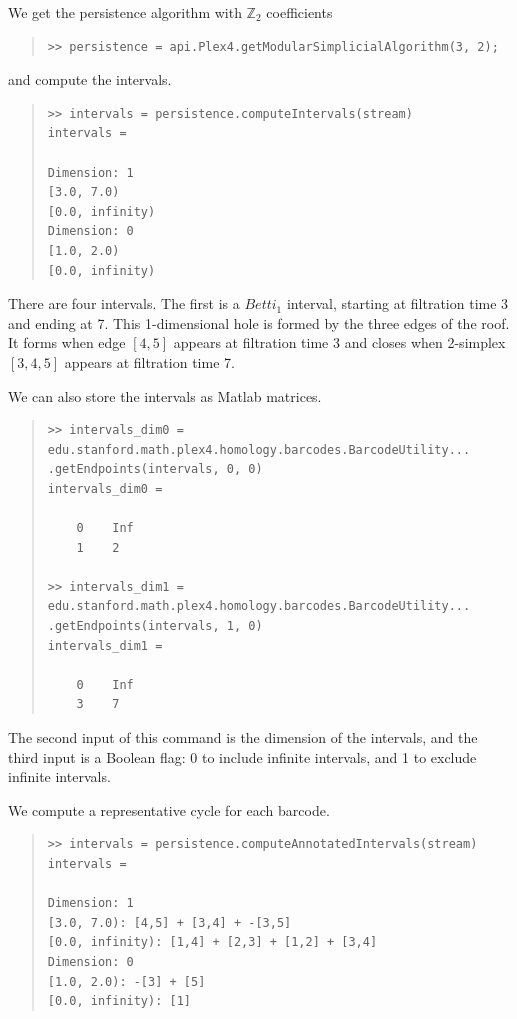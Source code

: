 \documentclass[amscd, amssymb, verbatim]{amsart}[12pt]
\theoremstyle{remark}
\theoremstyle{remark}
\theoremstyle{remark}
\begin{document}
We get the persistence algorithm with $\mathbb{Z}_2$ coefficients
\begin{quote} \begin{verbatim}
>> persistence = api.Plex4.getModularSimplicialAlgorithm(3, 2);
\end{verbatim} \end{quote}

and compute the intervals.

\begin{quote} \begin{verbatim}
>> intervals = persistence.computeIntervals(stream)
intervals =

Dimension: 1
[3.0, 7.0)
[0.0, infinity)
Dimension: 0
[1.0, 2.0)
[0.0, infinity)
\end{verbatim} \end{quote}

There are four intervals. The first is a $Betti_1$ interval, starting at filtration time 3 and ending at 7. This 1-dimensional hole is formed by the three edges of the roof. It forms when edge $[4,5]$ appears at filtration time 3 and closes when 2-simplex $[3,4,5]$ appears at filtration time 7.

We can also store the intervals as Matlab matrices.

\begin{quote} \begin{verbatim}
>> intervals_dim0 = edu.stanford.math.plex4.homology.barcodes.BarcodeUtility...
.getEndpoints(intervals, 0, 0)
intervals_dim0 =

    0    Inf
    1    2
    
>> intervals_dim1 = edu.stanford.math.plex4.homology.barcodes.BarcodeUtility...
.getEndpoints(intervals, 1, 0)
intervals_dim1 =

    0    Inf
    3    7
\end{verbatim} \end{quote}

The second input of this command is the dimension of the intervals, and the third input is a Boolean flag: 0 to include infinite intervals, and 1 to exclude infinite intervals.

We compute a representative cycle for each barcode.

\begin{quote} \begin{verbatim}
>> intervals = persistence.computeAnnotatedIntervals(stream)
intervals =

Dimension: 1
[3.0, 7.0): [4,5] + [3,4] + -[3,5]
[0.0, infinity): [1,4] + [2,3] + [1,2] + [3,4]
Dimension: 0
[1.0, 2.0): -[3] + [5]
[0.0, infinity): [1]
\end{verbatim} \end{quote}
\end{document}
